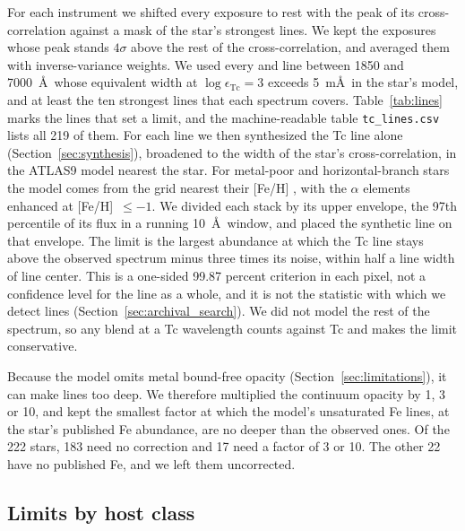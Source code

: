 \documentclass[final,5p]{elsarticle}
\begin{document}
For each instrument we shifted every exposure to rest with the peak of its cross-correlation against a mask of the star's strongest lines. We kept the exposures whose peak stands $4\sigma$ above the rest of the cross-correlation, and averaged them with inverse-variance weights. We used every  and  line between 1850 and 7000~\AA\ whose equivalent width at $\log\epsilon_\mathrm{Tc} = 3$ exceeds 5~m\AA\ in the star's model, and at least the ten strongest lines that each spectrum covers. Table~\ref{tab:lines} marks the lines that set a limit, and the machine-readable table \texttt{tc\_lines.csv} lists all 219 of them. For each line we then synthesized the Tc line alone (Section~\ref{sec:synthesis}), broadened to the width of the star's cross-correlation, in the ATLAS9 model nearest the star. For metal-poor and horizontal-branch stars the model comes from the grid nearest their [Fe/H] \citep{CastelliKurucz2003}, with the $\alpha$ elements enhanced at [Fe/H]~$\leq -1$. We divided each stack by its upper envelope, the 97th percentile of its flux in a running 10~\AA\ window, and placed the synthetic line on that envelope. The limit is the largest abundance at which the Tc line stays above the observed spectrum minus three times its noise, within half a line width of line center. This is a one-sided 99.87 percent criterion in each pixel, not a confidence level for the line as a whole, and it is not the statistic with which we detect lines (Section~\ref{sec:archival_search}). We did not model the rest of the spectrum, so any blend at a Tc wavelength counts against Tc and makes the limit conservative.

Because the model omits metal bound-free opacity (Section~\ref{sec:limitations}), it can make lines too deep. We therefore multiplied the continuum opacity by 1, 3 or 10, and kept the smallest factor at which the model's unsaturated Fe lines, at the star's published Fe abundance, are no deeper than the observed ones. Of the 222 stars, 183 need no correction and 17 need a factor of 3 or 10. The other 22 have no published Fe, and we left them uncorrected.

\subsection{Limits by host class}
\label{sec:archival_results}
\end{document}
